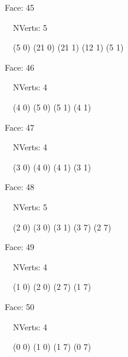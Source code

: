 \documentclass{article}
\begin{document}
{\footnotesize 

Face: 45

\   \    NVerts: 5

 \   \   (5 0) (21 0) (21 1) (12 1) (5 1)}

{\footnotesize 

Face: 46

\   \    NVerts: 4

 \   \   (4 0) (5 0) (5 1) (4 1)}

{\footnotesize 

Face: 47

\   \    NVerts: 4

 \   \   (3 0) (4 0) (4 1) (3 1)}

{\footnotesize 

Face: 48

\   \    NVerts: 5

 \   \   (2 0) (3 0) (3 1) (3 7) (2 7)}

{\footnotesize 

Face: 49

\   \    NVerts: 4

 \   \   (1 0) (2 0) (2 7) (1 7)}

{\footnotesize 

Face: 50

\   \    NVerts: 4

 \   \   (0 0) (1 0) (1 7) (0 7)}


 \newpage
\end{document}
